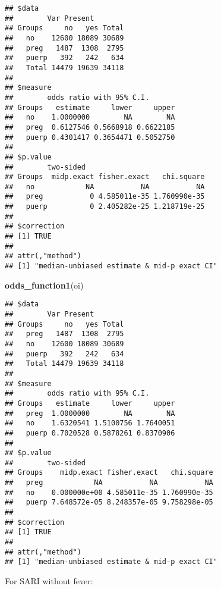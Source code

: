 \documentclass[
]{article}
\newenvironment{Shaded}{\begin{snugshade}}{\end{snugshade}}
\newcommand{\DataTypeTok}[1]{\textcolor[rgb]{0.13,0.29,0.53}{#1}}
\newcommand{\KeywordTok}[1]{\textcolor[rgb]{0.13,0.29,0.53}{\textbf{#1}}}
\newcommand{\NormalTok}[1]{#1}
\newcommand{\OperatorTok}[1]{\textcolor[rgb]{0.81,0.36,0.00}{\textbf{#1}}}
\newcommand{\OtherTok}[1]{\textcolor[rgb]{0.56,0.35,0.01}{#1}}
\newcommand{\StringTok}[1]{\textcolor[rgb]{0.31,0.60,0.02}{#1}}
\begin{document}
\begin{verbatim}
## $data
##        Var Present
## Groups     no   yes Total
##   no    12600 18089 30689
##   preg   1487  1308  2795
##   puerp   392   242   634
##   Total 14479 19639 34118
## 
## $measure
##        odds ratio with 95% C.I.
## Groups   estimate     lower     upper
##   no    1.0000000        NA        NA
##   preg  0.6127546 0.5668918 0.6622185
##   puerp 0.4301417 0.3654471 0.5052750
## 
## $p.value
##        two-sided
## Groups  midp.exact fisher.exact   chi.square
##   no            NA           NA           NA
##   preg           0 4.585011e-35 1.760990e-35
##   puerp          0 2.405282e-25 1.218719e-25
## 
## $correction
## [1] TRUE
## 
## attr(,"method")
## [1] "median-unbiased estimate & mid-p exact CI"
\end{verbatim}

\begin{Shaded}
\begin{Highlighting}[]
\KeywordTok{odds_function1}\NormalTok{(oi)}
\end{Highlighting}
\end{Shaded}

\begin{verbatim}
## $data
##        Var Present
## Groups     no   yes Total
##   preg   1487  1308  2795
##   no    12600 18089 30689
##   puerp   392   242   634
##   Total 14479 19639 34118
## 
## $measure
##        odds ratio with 95% C.I.
## Groups   estimate     lower     upper
##   preg  1.0000000        NA        NA
##   no    1.6320541 1.5100756 1.7640051
##   puerp 0.7020528 0.5878261 0.8370906
## 
## $p.value
##        two-sided
## Groups    midp.exact fisher.exact   chi.square
##   preg            NA           NA           NA
##   no    0.000000e+00 4.585011e-35 1.760990e-35
##   puerp 7.648572e-05 8.248357e-05 9.758298e-05
## 
## $correction
## [1] TRUE
## 
## attr(,"method")
## [1] "median-unbiased estimate & mid-p exact CI"
\end{verbatim}

For SARI without fever:

\begin{Shaded}
\end{Shaded}
\end{document}
